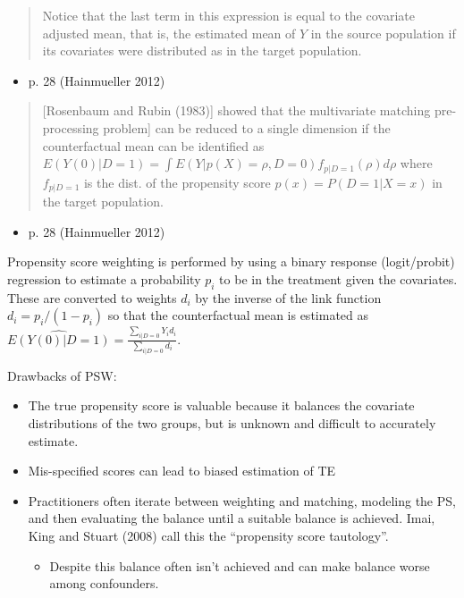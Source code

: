 \documentclass[
  letterpaper,
  DIV=11,
  numbers=noendperiod]{scrartcl}
\providecommand{\tightlist}{%
  \setlength{\itemsep}{0pt}\setlength{\parskip}{0pt}}\usepackage{longtable,booktabs,array}
\begin{document}
\begin{quote}
Notice that the last term in this expression is equal to the covariate
adjusted mean, that is, the estimated mean of \(Y\) in the source
population if its covariates were distributed as in the target
population.
\end{quote}

\begin{itemize}
\tightlist
\item
  p. 28 (Hainmueller 2012)
\end{itemize}

\begin{quote}
{[}Rosenbaum and Rubin (1983){]} showed that the multivariate matching
pre-processing problem{]} can be reduced to a single dimension if the
counterfactual mean can be identified as
\(E(Y(0)|D=1) = \int E(Y|p(X) = \rho, D=0) f_{p|D=1}(\rho)d\rho\) where
\(f_{p|D=1}\) is the dist. of the propensity score
\(p(x) = P(D=1 | X=x)\) in the target population.
\end{quote}

\begin{itemize}
\tightlist
\item
  p. 28 (Hainmueller 2012)
\end{itemize}

Propensity score weighting is performed by using a binary response
(logit/probit) regression to estimate a probability \(p_i\) to be in the
treatment given the covariates. These are converted to weights \(d_i\)
by the inverse of the link function \(d_i = p_i / (1-p_i)\) so that the
counterfactual mean is estimated as
\(\widehat{E(Y(0)|D=1)} = \frac{\sum_{i|D=0}Y_i d_i}{\sum_{i|D=0}d_i}.\)

Drawbacks of PSW:

\begin{itemize}
\item
  The true propensity score is valuable because it balances the
  covariate distributions of the two groups, but is unknown and
  difficult to accurately estimate.
\item
  Mis-specified scores can lead to biased estimation of TE
\item
  Practitioners often iterate between weighting and matching, modeling
  the PS, and then evaluating the balance until a suitable balance is
  achieved. Imai, King and Stuart (2008) call this the ``propensity
  score tautology''.

  \begin{itemize}
  \tightlist
  \item
    Despite this balance often isn't achieved and can make balance worse
    among confounders.
  \end{itemize}
\end{itemize}
\end{document}
